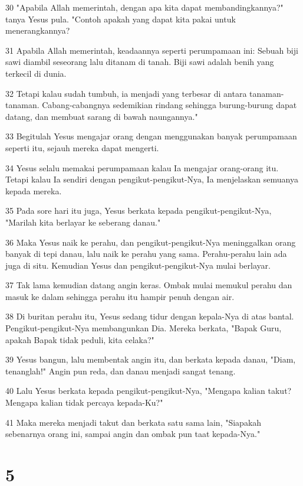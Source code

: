 \par 30 "Apabila Allah memerintah, dengan apa kita dapat membandingkannya?" tanya Yesus pula. "Contoh apakah yang dapat kita pakai untuk menerangkannya?
\par 31 Apabila Allah memerintah, keadaannya seperti perumpamaan ini: Sebuah biji sawi diambil seseorang lalu ditanam di tanah. Biji sawi adalah benih yang terkecil di dunia.
\par 32 Tetapi kalau sudah tumbuh, ia menjadi yang terbesar di antara tanaman-tanaman. Cabang-cabangnya sedemikian rindang sehingga burung-burung dapat datang, dan membuat sarang di bawah naungannya."
\par 33 Begitulah Yesus mengajar orang dengan menggunakan banyak perumpamaan seperti itu, sejauh mereka dapat mengerti.
\par 34 Yesus selalu memakai perumpamaan kalau Ia mengajar orang-orang itu. Tetapi kalau Ia sendiri dengan pengikut-pengikut-Nya, Ia menjelaskan semuanya kepada mereka.
\par 35 Pada sore hari itu juga, Yesus berkata kepada pengikut-pengikut-Nya, "Marilah kita berlayar ke seberang danau."
\par 36 Maka Yesus naik ke perahu, dan pengikut-pengikut-Nya meninggalkan orang banyak di tepi danau, lalu naik ke perahu yang sama. Perahu-perahu lain ada juga di situ. Kemudian Yesus dan pengikut-pengikut-Nya mulai berlayar.
\par 37 Tak lama kemudian datang angin keras. Ombak mulai memukul perahu dan masuk ke dalam sehingga perahu itu hampir penuh dengan air.
\par 38 Di buritan perahu itu, Yesus sedang tidur dengan kepala-Nya di atas bantal. Pengikut-pengikut-Nya membangunkan Dia. Mereka berkata, "Bapak Guru, apakah Bapak tidak peduli, kita celaka?"
\par 39 Yesus bangun, lalu membentak angin itu, dan berkata kepada danau, "Diam, tenanglah!" Angin pun reda, dan danau menjadi sangat tenang.
\par 40 Lalu Yesus berkata kepada pengikut-pengikut-Nya, "Mengapa kalian takut? Mengapa kalian tidak percaya kepada-Ku?"
\par 41 Maka mereka menjadi takut dan berkata satu sama lain, "Siapakah sebenarnya orang ini, sampai angin dan ombak pun taat kepada-Nya."

\chapter{5}

